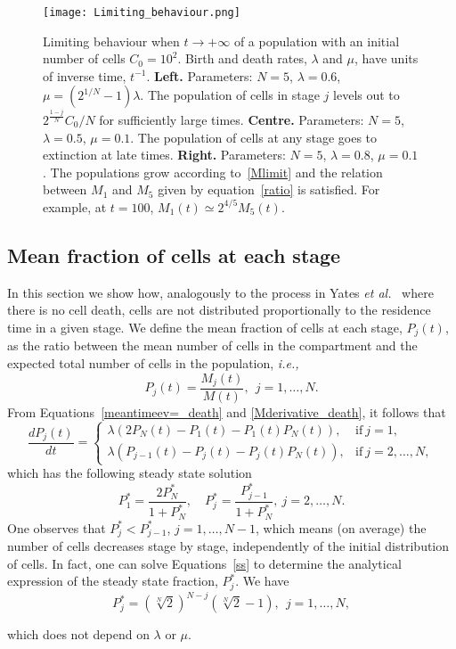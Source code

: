 \documentclass[10pt]{article}
\numberwithin{equation}{section}
\begin{document}
\begin{figure}
    \centering
    \texttt{[image: Limiting\_behaviour.png]}
    \caption{Limiting behaviour when $t \to +\infty$ of a population with an initial number of cells $C_0 = 10^2$. Birth and death rates, $\lambda$ and $\mu$, have units of inverse time, $t^{-1}$. {\bf Left.} Parameters: $N=5$, $\lambda = 0.6$, $\mu = (2^{1/N}-1)\lambda$. The population of cells in stage $j$ levels out to $2^{\frac{1-j}{N}} C_0/N$ for sufficiently large times.
    {\bf Centre.} Parameters: $N=5$, $\lambda=0.5$, $\mu = 0.1$. 
    The population of cells at any stage goes to extinction at late times. {\bf Right.} Parameters: $N=5$, $\lambda=0.8$, $\mu=0.1$. The populations grow according to~\eqref{Mlimit} and the relation between $M_1$ and $M_5$ given by equation~\eqref{ratio} is satisfied. For example, at $t=100$, $M_1(t) \simeq  2^{4/5}M_5(t)$.}
    \label{lim_beha}
\end{figure}

\subsection{Mean fraction of cells at each stage}
\label{sec:mean-proportion}

In this section we show how, analogously to the process in Yates {\em et al.}~\cite{yates} where there is no cell death, cells are not distributed proportionally to the residence time in a given stage. We define the mean fraction of cells at each stage, $P_j(t)$, as the ratio between the mean number of cells in the compartment and the expected total number of cells in the population, {\em i.e.,}
\begin{equation} \label{M_j_proportion}
P_j(t) = \frac{M_j(t)}{M(t)}, \ \ j=1,\ldots,N.
\end{equation}
From Equations~\eqref{meantimeev=_death} and \eqref{Mderivative_death}, it follows that
\begin{equation} \label{Mj_hat}
\frac{dP_j(t)}{dt}=
\begin{cases}
\lambda(2 P_N(t) - P_1(t) - P_1(t) P_N(t)), & \text{if} \ j=1, 
\\
\lambda(P_{j-1}(t) - P_j(t) - P_j(t) P_N(t)), & \text{if} \ j=2, \ldots, N,
\end{cases}
\end{equation}
which has the following steady state solution
\begin{equation} \label{ss}
P_1^*=\displaystyle{\frac{2 P_N^*}{1+P_N^*}},\quad P_j^*=\displaystyle{\frac{P_{j-1}^*}{1+P_N^*}},\  j=2, \ldots, N.
\end{equation}
One observes that $P_j^* < P_{j-1}^*$, $j=1,\ldots,N-1$, which means 
(on average) the number of cells decreases stage by stage, independently of the initial distribution of cells. In fact, one can solve Equations~\eqref{ss} to determine the analytical expression of the steady state
fraction, $P_j^*$. We have
\begin{equation}
P_j^* = \left(\sqrt[N]{2}\right)^{N-j} \left(\sqrt[N]{2} -1\right), \ \ j=1,\ldots,N,
\end{equation}
\par\noindent which does not depend on $\lambda$ or $\mu$.
\end{document}
